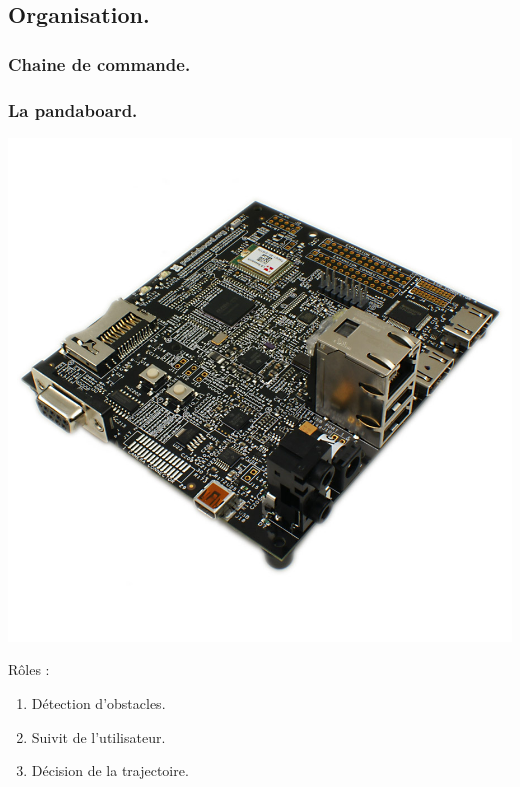 
\subsection{Organisation.}
\begin{frame}
    \frametitle{Chaine de commande.}
     {
        
    }
     {
        
    }
\end{frame}

\begin{frame}
    \frametitle{La pandaboard.}
    \begin{center}
        \includegraphics[scale=.15]{rcs/panda.png}
    \end{center}
     {
        Rôles : \begin{enumerate}
            \pause \item Détection d'obstacles.
            \pause \item Suivit de l'utilisateur.
            \pause \item Décision de la trajectoire.
        \end{enumerate}
    }
\end{frame}


